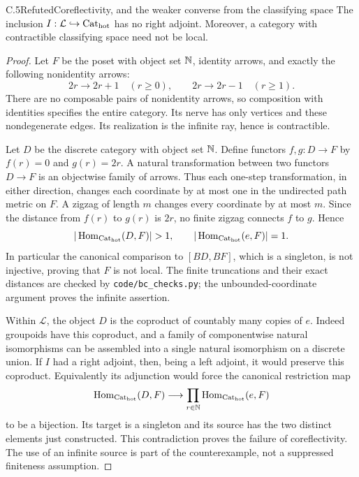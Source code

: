 \begin{claim}{C.5}{Refuted}{Coreflectivity, and the weaker converse from the classifying space}
The inclusion $I:\mathcal L\hookrightarrow{\mathrm{Cat}_{\mathrm{hot}}}$ has no right
adjoint.  Moreover, a category with contractible classifying space need
not be local.
\end{claim}
\begin{proof}
Let $F$ be the poset with object set $\mathbb N$, identity arrows, and exactly
the following nonidentity arrows:
\[
 2r\longrightarrow2r+1\quad(r\geq0),\qquad
 2r\longrightarrow2r-1\quad(r\geq1).
\]
There are no composable pairs of nonidentity arrows, so composition
with identities specifies the entire category.  Its nerve has only
vertices and these nondegenerate edges.  Its realization is the
infinite ray, hence is contractible.

Let $D$ be the discrete category with object set $\mathbb N$.  Define functors
$f,g:D\to F$ by $f(r)=0$ and $g(r)=2r$.  A natural transformation
between two functors $D\to F$ is an objectwise family of arrows.  Thus
each one-step transformation, in either direction, changes each
coordinate by at most one in the undirected path metric on $F$.
A zigzag of length $m$ changes every coordinate by at most $m$.
Since the distance from $f(r)$ to $g(r)$ is $2r$, no finite zigzag
connects $f$ to $g$.  Hence
\[
 |\Hom_{\Cathot}(D,F)|>1,
 \qquad |\Hom_{\Cathot}(e,F)|=1.
\]
In particular the canonical comparison to $[BD,BF]$, which is a
singleton, is not injective, proving that $F$ is not local.  The
finite truncations and their exact distances are checked by
\texttt{code/bc\_checks.py}; the unbounded-coordinate argument proves
the infinite assertion.

Within $\mathcal L$, the object $D$ is the coproduct of countably many
copies of $e$.  Indeed groupoids have this coproduct, and a family of
componentwise natural isomorphisms can be assembled into a single
natural isomorphism on a discrete union.  If $I$ had a right adjoint,
then, being a left adjoint, it would preserve this coproduct.
Equivalently its adjunction would force the canonical restriction map
\[
 \operatorname{Hom}_{{\mathrm{Cat}_{\mathrm{hot}}}}(D,F)\longrightarrow
     \prod_{r\in\mathbb N}\operatorname{Hom}_{{\mathrm{Cat}_{\mathrm{hot}}}}(e,F)
\]
to be a bijection.  Its target is a singleton and its source has the
two distinct elements just constructed.  This contradiction proves
the failure of coreflectivity.  The use of an infinite source is part
of the counterexample, not a suppressed finiteness assumption.
\end{proof}

